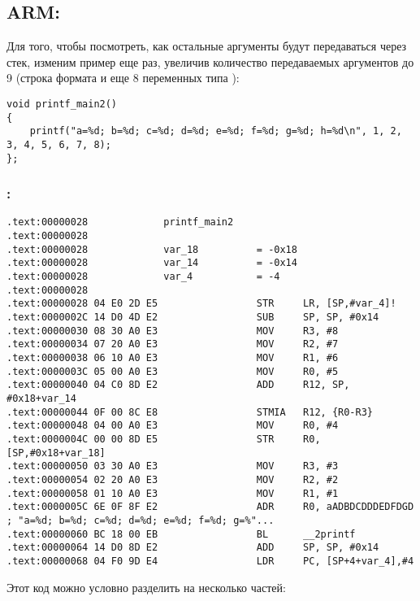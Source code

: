 ﻿\subsection{ARM: }

Для того, чтобы посмотреть, как остальные аргументы будут передаваться через стек, изменим пример еще раз, 
увеличив количество передаваемых аргументов до 9 (строка формата \printf и еще 8 переменных типа \Tint):

\begin{lstlisting}
void printf_main2()
{
	printf("a=%d; b=%d; c=%d; d=%d; e=%d; f=%d; g=%d; h=%d\n", 1, 2, 3, 4, 5, 6, 7, 8);
};
\end{lstlisting}

\subsubsection{\OptimizingKeil: \ARMMode}

\begin{lstlisting}
.text:00000028             printf_main2
.text:00000028
.text:00000028             var_18          = -0x18
.text:00000028             var_14          = -0x14
.text:00000028             var_4           = -4
.text:00000028
.text:00000028 04 E0 2D E5                 STR     LR, [SP,#var_4]!
.text:0000002C 14 D0 4D E2                 SUB     SP, SP, #0x14
.text:00000030 08 30 A0 E3                 MOV     R3, #8
.text:00000034 07 20 A0 E3                 MOV     R2, #7
.text:00000038 06 10 A0 E3                 MOV     R1, #6
.text:0000003C 05 00 A0 E3                 MOV     R0, #5
.text:00000040 04 C0 8D E2                 ADD     R12, SP, #0x18+var_14
.text:00000044 0F 00 8C E8                 STMIA   R12, {R0-R3}
.text:00000048 04 00 A0 E3                 MOV     R0, #4
.text:0000004C 00 00 8D E5                 STR     R0, [SP,#0x18+var_18]
.text:00000050 03 30 A0 E3                 MOV     R3, #3
.text:00000054 02 20 A0 E3                 MOV     R2, #2
.text:00000058 01 10 A0 E3                 MOV     R1, #1
.text:0000005C 6E 0F 8F E2                 ADR     R0, aADBDCDDDEDFDGD ; "a=%d; b=%d; c=%d; d=%d; e=%d; f=%d; g=%"...
.text:00000060 BC 18 00 EB                 BL      __2printf
.text:00000064 14 D0 8D E2                 ADD     SP, SP, #0x14
.text:00000068 04 F0 9D E4                 LDR     PC, [SP+4+var_4],#4
\end{lstlisting}

Этот код можно условно разделить на несколько частей:


